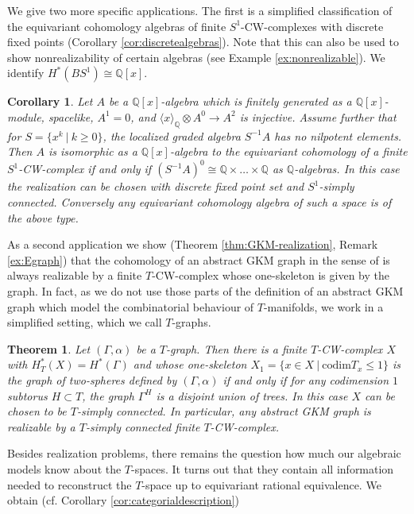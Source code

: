 \documentclass[12pt,a4paper]{article}
\newtheorem*{thm*}{Theorem}
\newtheorem*{cor*}{Corollary}
\theoremstyle{definition}
\begin{document}
We give two more specific applications. The first is a simplified classification of the equivariant cohomology algebras of finite $S^1$-CW-complexes with discrete fixed points (Corollary \ref{cor:discretealgebras}). Note that this can also be used to show nonrealizability of certain algebras (see Example \ref{ex:nonrealizable}). We identify $H^*(BS^1)\cong \mathbb{Q}[x]$.

\begin{cor*}
Let $A$ be a $\mathbb{Q}[x]$-algebra which is finitely generated as a $\mathbb{Q}[x]$-module, spacelike, $A^1=0$, and $\langle x\rangle_\mathbb{Q}\otimes A^0\rightarrow A^2$ is injective. Assume further that for $S=\{x^k~|~k\geq 0\}$, the localized graded algebra $S^{-1}A$ has no nilpotent elements. Then $A$ is isomorphic as a $\mathbb{Q}[x]$-algebra to the equivariant cohomology of a finite $S^1$-CW-complex if and only if $(S^{-1}A)^0\cong \mathbb{Q}\times\ldots\times \mathbb{Q}$ as $\mathbb{Q}$-algebras. In this case the realization can be chosen with discrete fixed point set and $S^1$-simply connected. Conversely any equivariant cohomology algebra of such a space is of the above type.
\end{cor*}

As a second application we show (Theorem \ref{thm:GKM-realization}, Remark \ref{ex:Egraph}) that the cohomology of an abstract GKM graph in the sense of \cite{GuilleminZara} is always realizable by a finite $T$-CW-complex whose one-skeleton is given by the graph. In fact, as we do not use those parts of the definition of an abstract GKM graph which model the combinatorial behaviour of $T$-manifolds, we work in a simplified setting, which we call $T$-graphs. 

\begin{thm*}
Let $(\Gamma,\alpha)$ be a $T$-graph. Then there is a finite $T$-CW-complex $X$ with $H^*_T(X)=H^*(\Gamma)$ and whose one-skeleton $X_1=\{x\in X~|~\mathrm{codim} T_x\leq 1\}$ is the graph of two-spheres defined by $(\Gamma,\alpha)$ if and only if for any codimension $1$ subtorus $H\subset T$, the graph $\Gamma^H$ is a disjoint union of trees. In this case $X$ can be chosen to be $T$-simply connected. In particular, any abstract GKM graph is realizable by a $T$-simply connected finite $T$-CW-complex.
\end{thm*}

Besides realization problems, there remains the question how much our algebraic models know about the $T$-spaces. It turns out that they contain all information needed to reconstruct the $T$-space up to equivariant rational equivalence. We obtain (cf. Corollary \ref{cor:categorialdescription})
\end{document}
